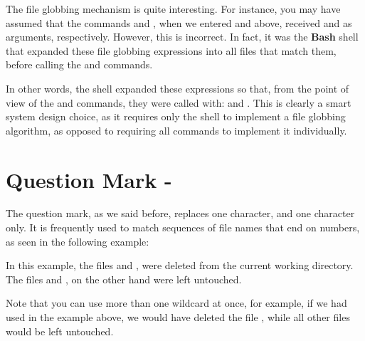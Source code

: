 \begin{my_box}
The file globbing mechanism is quite interesting. For instance, you may have assumed that the commands  and , when we entered  and  above, received  and  as arguments, respectively. However, this is incorrect. In fact, it was the \textbf{Bash} shell that expanded these file globbing expressions into all files that match them, before calling the  and  commands.

In other words, the shell expanded these expressions so that, from the point of view of the  and  commands, they were called with:  and . This is clearly a smart system design choice, as it requires only the shell to implement a file globbing algorithm, as opposed to requiring all commands to implement it individually.
\end{my_box}

\section{Question Mark - }

The question mark, as we said before, replaces one character, and one character only. It is frequently used to match sequences of file names that end on numbers, as seen in the following example:
In this example, the files  and , were deleted from the current working directory. The files  and , on the other hand were left untouched.

Note that you can use more than one wildcard at once, for example, if we had used  in the example above, we would have deleted the file , while all other files would be left untouched.

